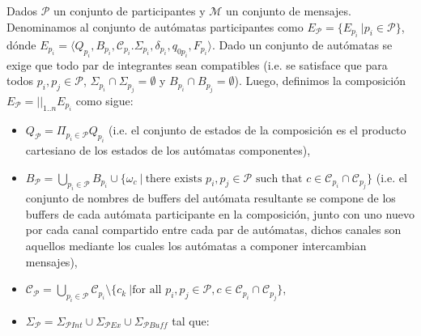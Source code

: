 \begin{definition}[Composición]
Dados $\mathcal{P}$ un conjunto de participantes y $\mathcal{M}$ un conjunto de mensajes. Denominamos al conjunto de autómatas participantes como $E_\mathcal{P} = \{E_{p_i} \ | p_i \in \mathcal{P}\}$, dónde $E_{p_i}= \langle Q_{p_i}, B_{p_i}, \mathcal{C}_{p_i}. \Sigma_{p_i}, \delta_{p_i}, q_{0{p_i}}, F_{p_i} \rangle$. Dado un conjunto de autómatas se exige que todo par de integrantes sean compatibles (i.e. se satisface que para todos $p_i, p_j \in \mathcal{P}$, $\Sigma_{p_i} \cap \Sigma_{p_j}= \emptyset$ y $B_{p_i} \cap B_{p_j} = \emptyset$). Luego, definimos la composición $E_\mathcal{P} = ||_{1..n} E_{p_i}$ como sigue:
\begin{itemize}
    \item $Q_\mathcal{P}= \Pi_{p_i \in \mathcal{P}} Q_{p_i}$ (i.e. el conjunto de estados de la composición es el producto cartesiano de los estados de los autómatas componentes),    
    \item $B_\mathcal{P} = \bigcup_{p_i \in \mathcal{P}} B_{p_i} \cup \{ \omega_c \ | \ \mbox{there exists } p_i, p_j \in \mathcal{P} \mbox{ such that } c \in \mathcal{C}_{p_i} \cap \mathcal{C}_{p_j} \}$ (i.e. el conjunto de nombres de buffers del autómata resultante se compone de los buffers de cada autómata participante en la composición, junto con uno nuevo por cada canal compartido entre cada par de autómatas, dichos canales son aquellos mediante los cuales los autómatas a componer intercambian mensajes),    
    \item $\mathcal{C}_\mathcal{P} = \bigcup_{p_i \in \mathcal{P}} \mathcal{C}_{p_i} \setminus \{ c_k \ | \mbox{for all } p_i, p_j \in \mathcal{P}, c \in \mathcal{C}_{p_i} \cap \mathcal{C}_{p_j} \}$,    
    \item $\Sigma_\mathcal{P} = \Sigma_{\mathcal{P}\mathit{Int}} \cup \Sigma_{\mathcal{P}\mathit{Ex}} \cup \Sigma_{\mathcal{P}\mathit{Buff}}$ tal que:    

\end{itemize}
\end{definition}
